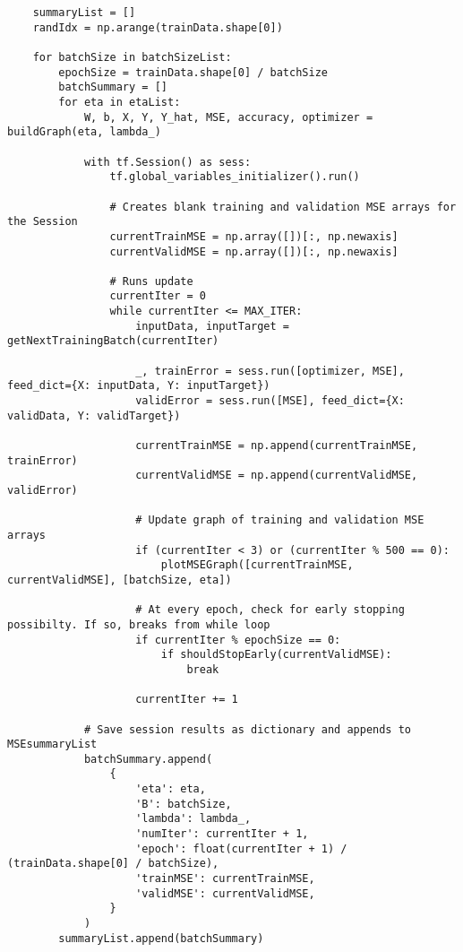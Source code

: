 \documentclass[a4paper,12pt]{article}
\begin{document}
\begin{verbatim}
    summaryList = []
    randIdx = np.arange(trainData.shape[0])
    
    for batchSize in batchSizeList:
        epochSize = trainData.shape[0] / batchSize
        batchSummary = []
        for eta in etaList:
            W, b, X, Y, Y_hat, MSE, accuracy, optimizer = buildGraph(eta, lambda_)

            with tf.Session() as sess:
                tf.global_variables_initializer().run()

                # Creates blank training and validation MSE arrays for the Session
                currentTrainMSE = np.array([])[:, np.newaxis]
                currentValidMSE = np.array([])[:, np.newaxis]

                # Runs update
                currentIter = 0
                while currentIter <= MAX_ITER:
                    inputData, inputTarget = getNextTrainingBatch(currentIter)

                    _, trainError = sess.run([optimizer, MSE], feed_dict={X: inputData, Y: inputTarget})
                    validError = sess.run([MSE], feed_dict={X: validData, Y: validTarget})

                    currentTrainMSE = np.append(currentTrainMSE, trainError)
                    currentValidMSE = np.append(currentValidMSE, validError)

                    # Update graph of training and validation MSE arrays
                    if (currentIter < 3) or (currentIter % 500 == 0):
                        plotMSEGraph([currentTrainMSE, currentValidMSE], [batchSize, eta])

                    # At every epoch, check for early stopping possibilty. If so, breaks from while loop
                    if currentIter % epochSize == 0:
                        if shouldStopEarly(currentValidMSE):
                            break

                    currentIter += 1

            # Save session results as dictionary and appends to MSEsummaryList
            batchSummary.append(
                {
                    'eta': eta,
                    'B': batchSize,
                    'lambda': lambda_,
                    'numIter': currentIter + 1,
                    'epoch': float(currentIter + 1) / (trainData.shape[0] / batchSize),
                    'trainMSE': currentTrainMSE,
                    'validMSE': currentValidMSE,
                }
            )
        summaryList.append(batchSummary)
            

\end{verbatim}
\end{document}
